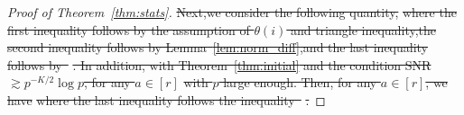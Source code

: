 \documentclass[lettersize,onecolumn,journal]{IEEEtran}
\theoremstyle{definition}
\theoremstyle{definition}
\newcommand{\of}[1]{\left(#1\right)}
\providecommand{\DIFdeltex}[1]{{\protect\color{red}\sout{#1}}}                      %
\providecommand{\DIFdel}[1]{\texorpdfstring{\DIFdeltex{#1}}{}} %
\begin{document}
\begin{proof}[Proof of Theorem~\ref{thm:stats}]
\DIFdel{Next,we consider the following quantity,}%
\DIFdel{where the first inequality follows by the assumption of $\theta(i)$ and triangle inequality,the second inequality follows by Lemma~\ref{lem:norm_diff},and the last inequality follows by~}%
\DIFdel{. In addition, with Theorem~\ref{thm:initial} and the condition SNR $\gtrsim p^{-K/2} \log p$, for any $a \in [r]$
}%
\DIFdel{with $p$ large enough. Then, for any $a \in [r]$, we have 
}%
\DIFdel{where the last inequality follows the inequality~}%
\DIFdel{.
}%


\end{proof}
\end{document}
